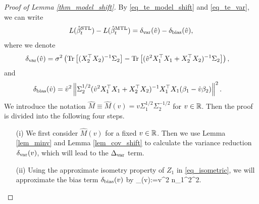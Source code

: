 \begin{proof}[Proof of Lemma \ref{thm_model_shift}]
By \eqref{eq_te_model_shift} and \eqref{eq_te_var}, we can write
\begin{align*}
L(\hat{\beta}_t^{\textup{STL}}) - L(\hat{\beta}_t^{\textup{MTL}})=\delta_{\text{var}}(\hat v) - \delta_{\text{bias}}(\hat v), 
\end{align*}
where we denote
\begin{align*}
\delta_{\text{var}}(\hat v)&=\sigma^2 \left(  \operatorname{Tr}\left[(X_2^{\top}X_2)^{-1}\Sigma_2\right] -  \operatorname{Tr}\left[( \hat{v}^2 X_1^{\top}X_1 + X_2^{\top}X_2)^{-1} \Sigma_2\right]\right), 
\end{align*}
and
\begin{align}\label{revise_deltabias}
 \delta_{\text{bias}}(\hat v)&= \hat{v}^2 \left\| \Sigma_2^{1/2}(\hat{v}^2 X_1^{\top}X_1 + X_2^{\top}X_2)^{-1} X_1^{\top}X_1 (\beta_1 - \hat{v} \beta_2) \right\|^2.
\end{align}
We introduce the notation $\hat M \equiv \hat M(v)= v\Sigma_1^{1/2}\Sigma_2^{-1/2}$ for $v\in \mathbb{R}$. Then the proof is divided into the following four steps. 
\begin{itemize}
\item[(i)] We first consider $ \hat M(v)$ for a fixed $v\in \mathbb{R}$. Then we use Lemma \ref{lem_minv} and Lemma \ref{lem_cov_shift} to calculate the variance reduction $\delta_{\text{var}}(v)$, which will lead to the $\Delta_{\text{var}}$ term.

\item[(ii)] Using the approximate isometry property of $Z_1$ in \eqref{eq_isometric}, we will approximate the bias term $ \delta_{\text{bias}}(v)$ by
\be\label{deltabetapf}
\wt\delta_{\bias}(v):={v}^2 n_1^2^2.\ee


\end{itemize}
\end{proof}
